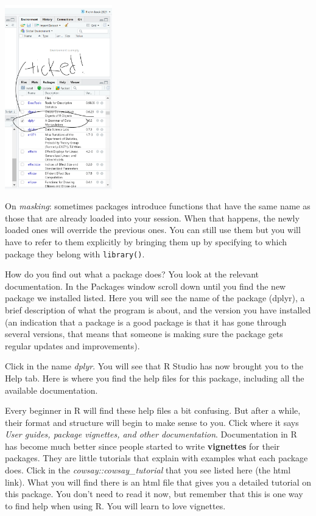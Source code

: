 \documentclass[
]{book}
\begin{document}
\includegraphics[width=0.35\textwidth,height=\textheight]{img/dplyr.png}

On \emph{masking}: sometimes packages introduce functions that have the same name as those that are already loaded into your session. When that happens, the newly loaded ones will override the previous ones. You can still use them but you will have to refer to them explicitly by bringing them up by specifying to which package they belong with \texttt{library()}.

How do you find out what a package does? You look at the relevant documentation. In the Packages window scroll down until you find the new package we installed listed. Here you will see the name of the package (dplyr), a brief description of what the program is about, and the version you have installed (an indication that a package is a good package is that it has gone through several versions, that means that someone is making sure the package gets regular updates and improvements).

Click in the name \emph{dplyr}. You will see that R Studio has now brought you to the Help tab. Here is where you find the help files for this package, including all the available documentation.

Every beginner in R will find these help files a bit confusing. But after a while, their format and structure will begin to make sense to you. Click where it says \emph{User guides, package vignettes, and other documentation}. Documentation in R has become much better since people started to write \textbf{vignettes} for their packages. They are little tutorials that explain with examples what each package does. Click in the \emph{cowsay::cowsay\_tutorial} that you see listed here (the html link). What you will find there is an html file that gives you a detailed tutorial on this package. You don't need to read it now, but remember that this is one way to find help when using R. You will learn to love vignettes.
\end{document}
